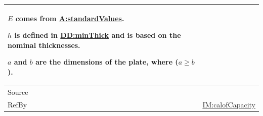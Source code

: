 \documentclass[12pt]{article}
\begin{document}
\begin{minipage}{\textwidth}
\begin{tabular}{>{\raggedright}p{}>{\raggedright\arraybackslash}p{}}
        $E$ comes from \hyperref[assumpSV]{A:standardValues}.
        
        $h$ is defined in \hyperref[DD:minThick]{DD:minThick} and is based on the nominal thicknesses.
        
        $a$ and $b$ are the dimensions of the plate, where ($a\geq{}b$).
        
\\ \midrule
Source & \cite{astm2009}
         
\\ \midrule
RefBy & \hyperref[IM:calofCapacity]{IM:calofCapacity}
        
\\ \bottomrule
\end{tabular}
\end{minipage}
\end{document}
